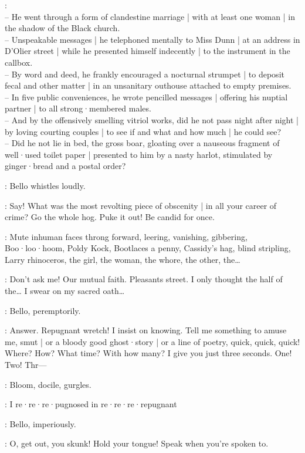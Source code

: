 \SinsPast:\\
-- He went through a form of clandestine marriage |
with at least one woman |
in the shadow of the Black church.\\
-- Unspeakable messages |
he telephoned mentally to Miss Dunn |
%
at an address in D'Olier street |
while he presented himself indecently |
to the instrument in the callbox.\\
-- By word and deed,
he frankly encouraged a nocturnal strumpet |
to deposit fecal and other matter |
in an unsanitary outhouse attached to empty premises.\\
-- In five public conveniences,
he wrote pencilled messages |
offering his nuptial partner |
to all strong·membered males.\\
-- And by the offensively smelling vitriol works,
did he not pass night after night |
by loving courting couples |
to see if and what and how much |
he could see?\\
-- Did he not lie in bed,
the gross boar,
gloating over a nauseous fragment of well·used toilet paper |
presented to him by a nasty harlot,
stimulated by ginger·bread and a postal order?%

:
Bello whistles loudly.

\Bello:
Say!
What was the most revolting piece of obscenity |
in all your career of crime?
Go the whole hog.
Puke it out!
Be candid for once.

:
Mute inhuman faces throng forward,
leering,
vanishing,
gibbering,
Boo·loo·hoom,
Poldy Kock,
Bootlaces a penny,
Cassidy's hag,
blind stripling,
Larry rhinoceros,
the girl,
the woman,
the whore,
the other,
the…

\Bloom:
Don't ask me!
Our mutual faith.
Pleasants street.
I only thought the half of the…
I swear on my sacred oath…%

:
Bello,
peremptorily.

\Bello:
Answer.
Repugnant wretch!
I insist on knowing.
Tell me something to amuse me,
smut |
or a bloody good ghost·story |
or a line of poetry,
quick,
quick,
quick!
Where?
How?
What time?
With how many?
I give you just three seconds.
One! Two! Thr---

:
Bloom,
docile,
gurgles.

\Bloom:
I re·re·re·pugnosed in re·re·re·repugnant

:
Bello,
imperiously.

\Bello:
O,
get out,
you skunk!
Hold your tongue!
Speak when you're spoken to.%


